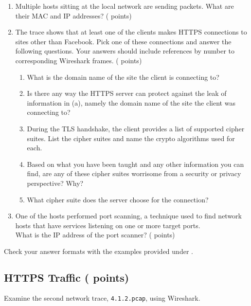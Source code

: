\begin{enumerate}
  \item \hypertarget{cp1macip}{Multiple hosts sitting at the local network are sending packets.
	What are their MAC and IP addresses? ( points)} \label{itm:macip}

  \item \hypertarget{cp1ftp}{The trace shows that at least one of the clients makes HTTPS connections to sites other than Facebook.
	Pick one of these connections and answer the following questions.
	Your answers should include references by number to corresponding Wireshark frames. ( points)} \label{itm:ftp}
	
    \begin{enumerate}[label=(\alph*),nosep]
      \item What is the domain name of the site the client is connecting to?
      \item Is there any way the HTTPS server can protect against the leak of information in (a),
			namely the domain name of the site the client was connecting to?
			\item During the TLS handshake, the client provides a list of supported cipher suites.
			List the cipher suites and name the crypto algorithms used for each.
			\item Based on what you have been taught and any other information you can find,
			are any of these cipher suites worrisome from a security or privacy perspective? Why?
			\item What cipher suite does the server choose for the connection?
    \end{enumerate}

  \item \hypertarget{cp1portscan}{One of the hosts performed port scanning, a technique used to find network hosts that have services listening on one or more target ports.\\
  What is the IP address of the port scanner? ( points)} \label{itm:portscan}

\end{enumerate}

Check your answer formats with the examples provided under \textit{}.

\newpage

\subsection{HTTPS Traffic ( points)}
\label{sec:cp1.2}
Examine the second network trace, \texttt{4.1.2.pcap}, using Wireshark.

